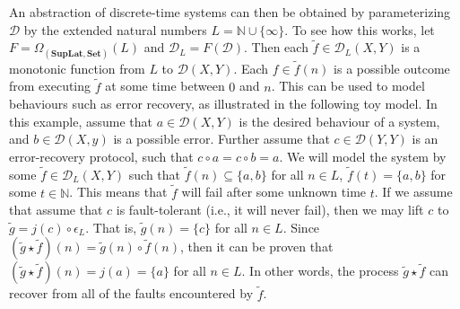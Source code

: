 \begin{exa}
\begin{itemize}
    \end{itemize}
    An abstraction of discrete-time systems can then be obtained by parameterizing $\mathcal{D}$ by the extended natural numbers $L = \mathbb{N} \cup \{ \infty \}$.
    To see how this works, let $F = \Omega_{(\mathbf{SupLat},\mathbf{Set})}( L )$ and $\mathcal{D}_L = F( \mathcal{D} )$.
    Then each $\widetilde{f} \in \mathcal{D}_L( X, Y )$ is a monotonic function from $L$ to $\mathcal{D}( X, Y )$.
    Each $f \in \widetilde{f}( n )$ is a possible outcome from executing $\widetilde{f}$ at some time between $0$ and $n$.
    This can be used to model behaviours such as error recovery, as illustrated in the following toy model.
    In this example, assume that $a \in \mathcal{D}( X, Y )$ is the desired behaviour of a system, and $b \in \mathcal{D}( X, y )$ is a possible error.
    Further assume that $c \in \mathcal{D}( Y, Y )$ is an error-recovery protocol, such that $c \circ a = c \circ b = a$.
    We will model the system by some $\widetilde{f} \in \mathcal{D}_L( X, Y )$ such that $\widetilde{f}( n ) \subseteq \{ a, b \}$ for all $n \in L$, $\widetilde{f}( t ) = \{ a, b \}$ for some $t \in \mathbb{N}$.
    This means that $\widetilde{f}$ will fail after some unknown time $t$.
    If we assume that assume that $c$ is fault-tolerant (i.e., it will never fail), then we may lift $c$ to $\widetilde{g} = j( c ) \circ \epsilon_L$.
    That is, $\widetilde{g}( n ) = \{ c \}$ for all $n \in L$.
    Since $( \widetilde{g} \star \widetilde{f} )( n ) = \widetilde{g}( n ) \circ \widetilde{f}( n )$, then it can be proven that $( \widetilde{g} \star \widetilde{f} )( n ) = j( a ) = \{ a \}$ for all $n \in L$.
    In other words, the process $\widetilde{g} \star \widetilde{f}$ can recover from all of the faults encountered by $\widetilde{f}$.
\end{exa}
